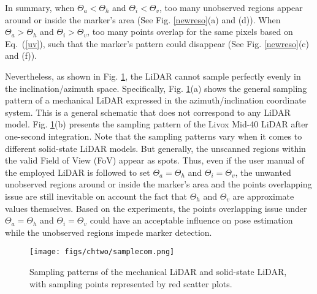 In summary, when  $\Theta_{a}<\Theta_{h}$ and $\Theta_{i}<\Theta_{v}$, too many unobserved regions appear around or inside the marker's area (See Fig. \ref{newreso}(a) and (d)). When  $\Theta_{a}>\Theta_{h}$ and $\Theta_{i}>\Theta_{v}$, too many points overlap for the same pixels based on Eq.~(\ref{uv}), such that the marker's pattern could disappear (See Fig. \ref{newreso}(c) and (f)). \par
%
%
Nevertheless, as shown in Fig. \ref{samplecom}, the LiDAR cannot sample perfectly evenly in the inclination/azimuth space. Specifically, Fig. \ref{samplecom}(a) shows the general sampling pattern of a mechanical LiDAR expressed in the azimuth/inclination coordinate system. This is a general schematic that does not correspond to any LiDAR model. Fig. \ref{samplecom}(b) presents the sampling pattern of the Livox Mid-40 LiDAR after one-second integration. Note that the sampling patterns vary when it comes to different solid-state LiDAR models. But generally, the unscanned regions within the valid Field of View (FoV) appear as spots.
%
Thus, even if the user manual of the employed LiDAR is followed to set $\Theta_{a}=\Theta_{h}$ and $\Theta_{i}=\Theta_{v}$, the unwanted unobserved regions around or inside the marker's area and the points overlapping issue are still inevitable on account the fact that $\Theta_{h}$ and $\Theta_{v}$ are approximate values themselves. Based on the experiments, the points overlapping issue under $\Theta_{a}=\Theta_{h}$ and $\Theta_{i}=\Theta_{v}$ could have an acceptable influence on pose estimation while the unobserved regions impede marker detection.
\begin{figure}[H] 
	\centering
	\texttt{[image: figs/chtwo/samplecom.png]}
	\caption{Sampling patterns of the mechanical LiDAR and solid-state LiDAR, with sampling points represented by red scatter plots.
 }
	\label{samplecom}
\end{figure} \par

